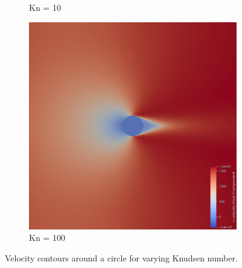 \begin{figure}
\begin{subfigure}{0.32\textwidth}
        \caption{Kn = 10}
    \end{subfigure}
    \hfill
    \begin{subfigure}{0.32\textwidth}
        \centering
        \includegraphics[width=\textwidth]{Images/4. Results/Circle Kn/pv/Kn100.png}
        \caption{Kn = 100}
    \end{subfigure}
    \caption{Velocity contours around a circle for varying Knudsen number.}
    \label{fig:vcontourcircle}
\end{figure}

